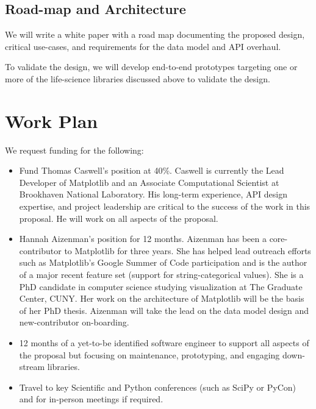 \documentclass[11pt,letterpaper]{article}  %
\begin{document}
\subsection{Road-map and Architecture}

We will write a white paper with a road map documenting the proposed
design, critical use-cases, and requirements for the data model and
API overhaul.

To validate the design, we will develop end-to-end prototypes
targeting one or more of the life-science libraries discussed above
to validate the design.


\section{Work Plan}

We request funding for the following:


\begin{itemize}[noitemsep]

\item Fund Thomas Caswell's position at 40\%.  Caswell is
  currently the Lead Developer of Matplotlib and an Associate
  Computational Scientist at Brookhaven National Laboratory.  His
  long-term experience, API design expertise, and project leadership
  are critical to the success of the work in this proposal.  He will work
  on all aspects of the proposal.
\item Hannah Aizenman's position for 12 months.  Aizenman has
  been a core-contributor to Matplotlib for three years. She has helped lead outreach efforts such as
  Matplotlib's Google Summer of Code participation and is the author of a major recent feature set
  (support for string-categorical values).
  She is a PhD candidate in computer science studying visualization at The
  Graduate Center, CUNY.  Her work on the architecture of
  Matplotlib will be the basis of her PhD thesis.  Aizenman will take
  the lead on the data model design and new-contributor on-boarding.
\item 12 months of a yet-to-be identified software engineer to
  support all aspects of the proposal but focusing on maintenance,
  prototyping, and engaging down-stream libraries.
\item Travel to key Scientific and Python conferences (such as SciPy
  or PyCon) and for in-person meetings if required.
\end{itemize}
\end{document}
